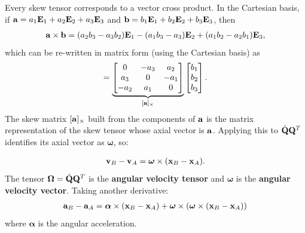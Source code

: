 \documentclass[
  letterpaper,
  DIV=11,
  numbers=noendperiod]{scrreprt}
\newcommand{\bomega}{\boldsymbol{\omega}}
\newcommand{\bOmega}{\boldsymbol{\Omega}}
\newcommand{\balpha}{\boldsymbol{\alpha}}
\begin{document}
\begin{tcolorbox}[enhanced jigsaw, arc=.35mm, bottomrule=.15mm, bottomtitle=1mm, breakable, colback=white, colbacktitle=quarto-callout-important-color!10!white, colframe=quarto-callout-important-color-frame, coltitle=black, left=2mm, leftrule=.75mm, opacityback=0, opacitybacktitle=0.6, rightrule=.15mm, title=\textcolor{quarto-callout-important-color}{\faExclamation}\hspace{0.5em}{Note!}, titlerule=0mm, toprule=.15mm, toptitle=1mm]

Every skew tensor corresponds to a vector cross product. In the
Cartesian basis, if \({\bf a} = a_1{\bf E}_1+a_2{\bf E}_2+a_3{\bf E}_3\)
and \({\bf b} = b_1{\bf E}_1+b_2{\bf E}_2+b_3{\bf E}_3\), then
\begin{align}
    {\bf a}\times{\bf b} = (a_2b_3-a_3b_2){\bf E}_1-(a_1b_3-a_3){\bf E}_2+(a_1b_2-a_2b_1){\bf E}_3,
\end{align} which can be re-written in matrix form (using the Cartesian
basis) as \begin{align}
    [{\bf a}\times{\bf b}] = \underbrace{\begin{bmatrix}0&-a_3&a_2\\a_3&0&-a_1\\-a_2&a_1&0\end{bmatrix}}_{[{\bf a}]_\times}\begin{bmatrix}b_1\\b_2\\b_3\end{bmatrix}.
\end{align} The skew matrix \([{\bf a}]_\times\) built from the
components of \({\bf a}\) is the matrix representation of the skew
tensor whose axial vector is \({\bf a}\). Applying this to
\(\dot{\bf Q}{\bf Q}^T\) identifies its axial vector as \(\bomega\), so:

\end{tcolorbox}

\begin{align}
    {\bf v}_B-{\bf v}_A = \bomega\times({\bf x}_B-{\bf x}_A).
\end{align} The tensor \(\bOmega = \dot{\bf Q}{\bf Q}^T\) is the
\textbf{angular velocity tensor} and \(\bomega\) is the \textbf{angular
velocity vector}. Taking another derivative: \begin{align}
    {\bf a}_B-{\bf a}_A = \balpha\times({\bf x}_B-{\bf x}_A)+\bomega\times(\bomega\times({\bf x}_B-{\bf x}_A))
\end{align} where \(\balpha\) is the angular acceleration.
\end{document}
